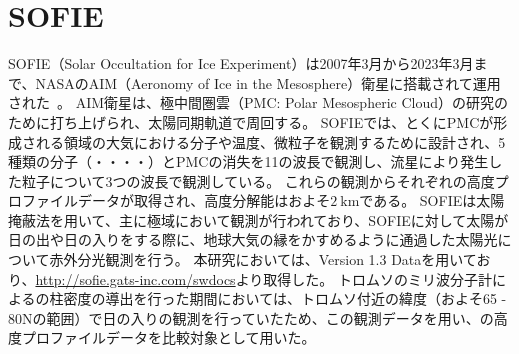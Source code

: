\chapter{SOFIE}
\label{app:sofie}
SOFIE（Solar Occultation for Ice Experiment）は2007年3月から2023年3月まで、NASAのAIM（Aeronomy of Ice in the Mesosphere）衛星に搭載されて運用された~\cite{russell2009aeronomy,sofie2006sdl}。
AIM衛星は、極中間圏雲（PMC: Polar Mesospheric Cloud）の研究のために打ち上げられ、太陽同期軌道で周回する。
SOFIEでは、とくにPMCが形成される領域の大気における分子や温度、微粒子を観測するために設計され、5種類の分子（・・・・）とPMCの消失を11の波長で観測し、流星により発生した粒子について3つの波長で観測している。
これらの観測からそれぞれの高度プロファイルデータが取得され、高度分解能はおよそ$2\ \mathrm{km}$である。
SOFIEは太陽掩蔽法を用いて、主に極域において観測が行われており、SOFIEに対して太陽が日の出や日の入りをする際に、地球大気の縁をかすめるように通過した太陽光について赤外分光観測を行う。
本研究においては、Version 1.3 Dataを用いており、\url{http://sofie.gats-inc.com/swdocs}より取得した。
トロムソのミリ波分子計によるの柱密度の導出を行った期間においては、トロムソ付近の緯度（およそ65 - 80\textdegree Nの範囲）で日の入りの観測を行っていたため、この観測データを用い、の高度プロファイルデータを比較対象として用いた。
